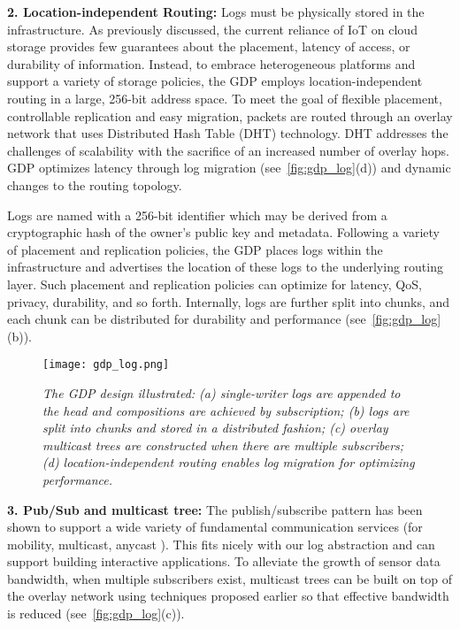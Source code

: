 \textbf{2. Location-independent Routing:} Logs must be physically
stored in the infrastructure. As previously discussed,
the current reliance of IoT on cloud storage provides
few guarantees about the placement, latency of access,
or durability of information. Instead, to embrace heterogeneous
platforms and support a variety of storage
policies, the GDP employs location-independent routing
in a large, 256-bit address space. To meet the goal of
flexible placement, controllable replication and easy migration,
packets are routed through an overlay network
that uses Distributed Hash Table (DHT) technology. DHT
addresses the challenges of scalability \cite{pastry, chord, tapestry} with
the sacrifice of an increased number of overlay hops. GDP
optimizes latency through log migration (see~\autoref{fig:gdp_log}(d))
and dynamic changes to the routing topology.

Logs are named with a 256-bit identifier which may be
derived from a cryptographic hash of the owner’s public
key and metadata. Following a variety of placement and
replication policies,
the GDP places logs within the infrastructure
and advertises the location of these logs to the
underlying routing layer. Such placement and replication
policies can optimize for latency, QoS, privacy, durability,
and so forth. Internally, logs are further split into chunks,
and each chunk can be distributed for durability \cite{oceanstore} and
performance \cite{bolt} (see~\autoref{fig:gdp_log}(b)).

\begin{figure}[t]
	\begin{center}
		\texttt{[image: gdp\_log.png]}
	\end{center}
	\vspace{-1.3em}
	\caption{\small \itshape  The GDP design illustrated: (a) single-writer logs are appended to the head and compositions are achieved by subscription;
		(b) logs are split into chunks and stored in a distributed fashion; (c) overlay multicast trees are constructed when there are multiple
		subscribers; (d) location-independent routing enables log migration for optimizing performance.}
	\vspace{-1em}
	\label{fig:gdp_log}
\end{figure}

\textbf{3. Pub/Sub and multicast tree:} The publish/subscribe
pattern has been shown to support a wide variety of fundamental
communication services (for mobility, multicast,
anycast \cite{indirection}). This fits nicely with our log abstraction
and can support building interactive applications. To
alleviate the growth of sensor data bandwidth, when multiple
subscribers exist, multicast trees can be built on top
of the overlay network using techniques proposed earlier \cite{cbt, tapestry} so that effective bandwidth is reduced \cite{narada} 
(see~\autoref{fig:gdp_log}(c)).

